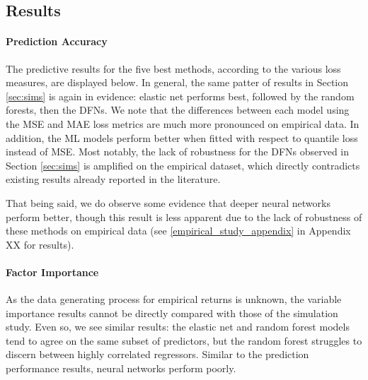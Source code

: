 \documentclass{article}
\begin{document}
\subsection{Results}



\paragraph{Prediction Accuracy}
The predictive results for the five best methods, according to the various loss measures, are displayed below. In general, the same patter of results in Section \ref{sec:sims} is again in evidence:  elastic net performs best, followed by the random forests, then the DFNs. We note that the differences between each model using the MSE and MAE loss metrics are much more pronounced on empirical data. In addition, the ML models perform better when fitted with respect to quantile loss instead of MSE. Most notably, the lack of robustness for the DFNs observed in Section \ref{sec:sims} is amplified on the empirical dataset, which directly contradicts existing results already reported in the literature.



That being said, we do observe some evidence that deeper neural networks perform better, though this result is less apparent due to the lack of robustness of these methods on empirical data (see \ref{empirical_study_appendix} in Appendix XX for results).


\paragraph{Factor Importance}
As the data generating process for empirical returns is unknown, the variable importance results cannot be directly compared with those of the simulation study. Even so, we see similar results: the elastic net and random forest models tend to agree on the same subset of predictors, but the random forest struggles to discern between highly correlated regressors. Similar to the prediction performance results, neural networks perform poorly.
\end{document}
